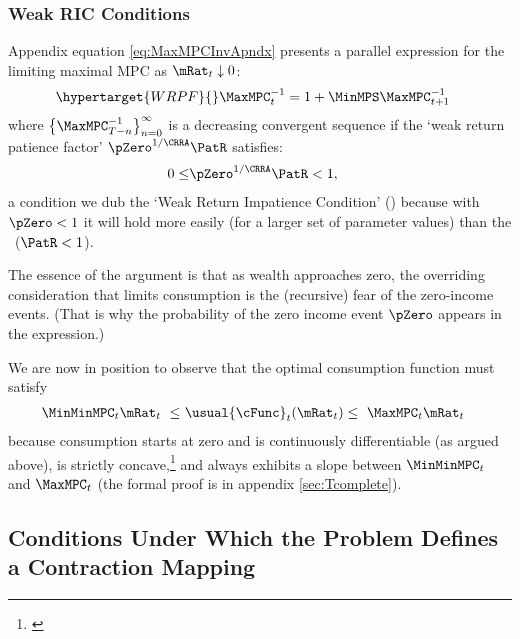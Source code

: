 \documentclass[BufferStockTheory]{subfiles}
\begin{document}
\subsubsection{Weak RIC Conditions}{}\label{sec:WRIC}
\hypertarget{MPCnvrsUpper}{}
\hypertarget{WRIC}{}
Appendix equation \eqref{eq:MaxMPCInvApndx} presents a parallel expression for the limiting maximal MPC as $\mRat_{t} \downarrow 0$:
\begin{align}\hypertarget{WRPF}{}  
  \MaxMPC_{t}^{-1}  & = 1+\MinMPS \MaxMPC_{t+1}^{-1} \label{eq:MaxMPCInv}
\end{align}
where $\left\{\MaxMPC_{T-n}^{-1}\right\} _{n=0}^{\infty}$ is a decreasing %
convergent sequence if the `weak return patience factor' $\pZero^{1/\CRRA}\PatR$ satisfies:
\begin{align}
  0 \leq & \pZero^{1/\CRRA} \PatR < 1 \label{eq:WRIC},
\end{align}
a condition we dub the `Weak Return Impatience Condition' (\WRIC)
because with $\pZero < 1$ it will hold more easily (for a larger set of parameter
values) than the \RIC~($\PatR < 1$).

The essence of the argument is that as wealth approaches zero, the overriding
consideration that limits consumption is the (recursive) fear of the zero-income events.  (That is why the probability of the zero
income event $\pZero$ appears in the expression.)  

\hypertarget{cBounds}{}
We are now in position to observe that the optimal consumption function must satisfy
\begin{align}
  \MinMinMPC_{t} \mRat_{t} ~ \leq & ~  \usual{\cFunc}_{t}(\mRat_{t})  \leq  ~ \MaxMPC_{t} \mRat_{t} \label{eq:cBounds}
\end{align}
because consumption starts at zero and is continuously differentiable (as argued above), is strictly concave,\footnote{\cite{ckConcavity}} and always exhibits a slope between $\MinMinMPC_{t}$ and $\MaxMPC_{t}$ (the formal proof is in appendix \ref{sec:Tcomplete}).


\begin{comment}
  If the \FHWC~does not hold, we make do with a less useful bound on the minimal MPC: It is
  weakly greater than zero, which follows from the logic in
  \ref{sec:cExists}; hence the `max' in \eqref{eq:MinMinMPCDef}.
\end{comment}

\hypertarget{Conditions-Under-Which-the-Problem-Defines-a-Contraction-Mapping}{}
\subsection{Conditions Under Which the Problem Defines a Contraction Mapping}
\end{document}

